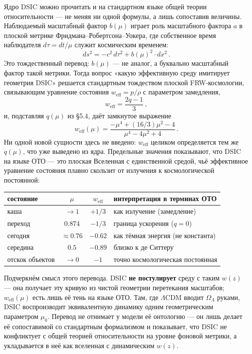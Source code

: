 \documentclass{article}
\begin{document}
Ядро DSIC можно прочитать и на стандартном языке общей теории относительности --- не меняя ни одной формулы, а лишь сопоставив величины. Наблюдаемый масштабный фактор $b(\mu)$ играет роль масштабного фактора $a$ в плоской метрике Фридмана--Робертсона--Уокера, где собственное время наблюдателя $d\tau = dt/\mu$ служит космическим временем:
\begin{equation}
ds^2 = -c^2\, d\tau^2 + b(\mu)^2 \cdot dx^2\,.
\end{equation}
Это тождественный перевод: $b(\mu)$ --- не аналог, а буквально масштабный фактор такой метрики. Тогда вопрос «какую эффективную среду имитирует геометрия DSIC» решается стандартным тождеством плоской FRW-космологии, связывающим уравнение состояния $w_{\text{eff}} = p/\rho$ с параметром замедления,
\begin{equation}
w_{\text{eff}} = \frac{2q - 1}{3}\,,
\end{equation}
и, подставляя $q(\mu)$ из \S5.4, даёт замкнутое выражение
\begin{equation}
w_{\text{eff}}(\mu) = \frac{-\mu^4 + (16/3)\mu^2 - 4}{\mu^4 - 4\mu^2 + 4}\,.
\end{equation}
Ни одной новой сущности здесь не введено: $w_{\text{eff}}$ целиком определяется тем же $q(\mu)$, что уже выведено из ядра. Предельные значения показывают, что DSIC на языке ОТО --- это плоская Вселенная с единственной средой, чьё эффективное уравнение состояния плавно скользит от излучения к космологической постоянной:

\begin{table}[htbp]
\centering
\small
\begin{tabular}{@{}lccl@{}}
\toprule
\textbf{состояние} & $\mu$ & $w_{\text{eff}}$ & \textbf{интерпретация в терминах ОТО} \\
\midrule
каша & $\to 1$ & $+1/3$ & как излучение (замедление) \\
переход & $0.874$ & $-1/3$ & граница ускорения ($q = 0$) \\
сегодня & $\approx 0.76$ & $-0.62$ & как тёмная энергия (не константа) \\
середина & $0.5$ & $-0.89$ & близко к де Ситтеру \\
отскок объектов & $\to 0$ & $-1$ & точно космологическая постоянная \\
\bottomrule
\end{tabular}
\end{table}

Подчеркнём смысл этого перевода. DSIC \textbf{не постулирует} среду с таким $w(z)$ --- она получает эту кривую из чистой геометрии перетекания масштабов; $w_{\text{eff}}(\mu)$ есть лишь её тень на языке ОТО. Там, где $\Lambda$CDM вводит $\Omega_\Lambda$ руками, DSIC воспроизводит эквивалентную динамику одним геометрическим параметром $\mu_0$. Перевод не отнимает у модели её онтологию --- он лишь делает её сопоставимой со стандартным формализмом и показывает, что DSIC не конфликтует с общей теорией относительности на уровне фоновой метрики, а укладывается в неё как вселенная с динамическим $w(z)$.
\end{document}
